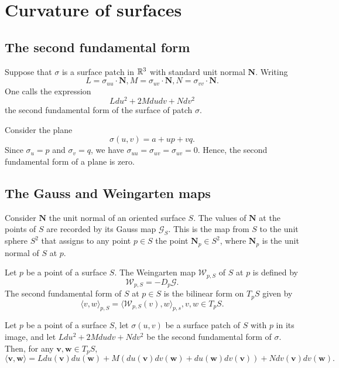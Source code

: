 \section{Curvature of surfaces}

\subsection{The second fundamental form}

Suppose that $\sigma$ is a surface patch in $\mathbb{R}^3$ with standard unit
normal $\bm{N}$.
Writing
\[
  L = \sigma_{uu} \cdot \bm{N},
  M = \sigma_{uv} \cdot \bm{N},
  N = \sigma_{vv} \cdot \bm{N}.
\]
One calls the expression
\[
  L du^2 + 2 M du dv + N dv^2  
\]
the second fundamental form of the surface of patch $\sigma$.

\begin{example}
  Consider the plane
  \[
    \sigma(u, v) = a + up + vq.  
  \]
  Since $\sigma_u = p$ and $\sigma_v = q$, we have
  $\sigma_{uu} = \sigma_{uv} = \sigma_{uv} = 0$.
  Hence, the second fundamental form of a plane is zero.
\end{example}

\subsection{The Gauss and Weingarten maps}

Consider $\bm{N}$ the unit normal of an oriented surface $S$.
The values of $\bm{N}$ at the points of $S$ are recorded by its
Gauss map $\mathcal{G}_S$. This is the map from $S$ to the unit
sphere $S^2$ that assigns to any point $p \in S$ the point
$\bm{N}_p \in S^2$, where $\bm{N}_p$ is the unit normal of
$S$ at $p$.

\begin{defn}
  Let $p$ be a point of a surface $S$. The Weingarten map
  $\mathcal{W}_{p, S}$ of $S$ at $p$ is defined by
  \[
    \mathcal{W}_{p, S} = -D_p \mathcal{G}.
  \]
  The second fundamental form of $S$ at $p \in S$ is the bilinear
  form on $T_p S$ given by
  \[
    \langle v, w \rangle_{p, S} = 
    \langle \mathcal{W}_{p, S}(v), w \rangle_{p, s},
    v, w \in T_p S.
  \]
\end{defn}

\begin{proposition}
  Let $p$ be a point of a surface $S$, let $\sigma(u, v)$ be a surface
  patch of $S$ with $p$ in its image, and let
  $L du^2 + 2 M du dv + N dv^2$ be the second fundamental form of
  $\sigma$. Then, for any $\bm{v}, \bm{w} \in T_p S$,
  \[
    \langle \bm{v}, \bm{w} \rangle = 
    L du(\bm{v}) du(\bm{w}) +
    M(du(\bm{v}) dv(\bm{w}) + du(\bm{w}) dv(\bm{v})) +
    N dv(\bm{v}) dv(\bm{w}).
  \]
\end{proposition}

